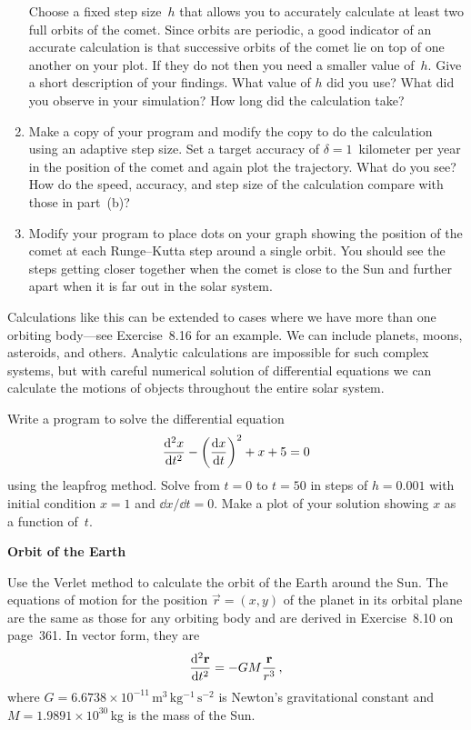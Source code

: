 \documentclass[12pt]{article}
\begin{document}
\begin{exercises}
\begin{enumerate}
  Choose a fixed step size~$h$ that allows you to accurately calculate at
  least two full orbits of the comet.  Since orbits are periodic, a good
  indicator of an accurate calculation is that successive orbits of the
  comet lie on top of one another on your plot.  If they do not then you
  need a smaller value of~$h$.  Give a short description of your findings.
  What value of $h$ did you use?  What did you observe in your simulation?
  How long did the calculation take?
\item Make a copy of your program and modify the copy to do the calculation
  using an adaptive step size.  Set a target accuracy of
  $\delta=1$~kilometer per year in the position of the comet and again plot
  the trajectory.  What do you see?  How do the speed, accuracy, and step
  size of the calculation compare with those in part~(b)?
\item Modify your program to place dots on your graph showing the position
  of the comet at each Runge--Kutta step around a single orbit.  You should
  see the steps getting closer together when the comet is close to the Sun
  and further apart when it is far out in the solar system.
\end{enumerate}

Calculations like this can be extended to cases where we have more than one
orbiting body---see Exercise~8.16 for an example.  We can include planets,
moons, asteroids, and others.  Analytic calculations are impossible for
such complex systems, but with careful numerical solution of differential
equations we can calculate the motions of objects throughout the entire
solar system.



\exercise Write a program to solve the differential equation
\begin{displaymath}
{\mathrm{d}^2 x\over\mathrm{d}t^2} - \biggl( {\mathrm{d} x\over\mathrm{d} t} \biggr)^2 + x + 5 = 0
\end{displaymath}
using the leapfrog method.  Solve from $t=0$ to $t=50$ in steps of
$h=0.001$ with initial condition $x=1$ and $\dd x/\dd t = 0$.  Make a plot
of your solution showing $x$ as a function of~$t$.



\exercise \textbf{Orbit of the Earth}

\exskip Use the Verlet method to calculate the orbit of the Earth around
the Sun.  The equations of motion for the position $\vec{r} = (x,y)$ of the
planet in its orbital plane are the same as those for any orbiting body and
are derived in Exercise~8.10 on page~361.  In vector form, they are
\begin{displaymath}
{\mathrm{d}^2\mathbf{r}\over\mathrm{d}t^2} = -GM {\mathbf{r}\over r^3}\,,
\end{displaymath}
where $G=6.6738\times10^{-11}\,\mathrm{m^3\,kg^{-1}\,s^{-2}}$ is Newton's
gravitational constant and $M=1.9891\times10^{30}\,$kg is the mass of the
Sun.


\end{exercises}
\end{document}
